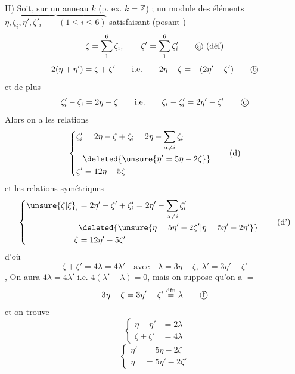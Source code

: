 II) Soit, sur un anneau $k$  (p. ex. $k=\mathbb Z$) ; un module   des éléments $\overbrace{\eta,\zeta_i,\eta',\zeta'_i\qquad(1\le i\le6)}$ satisfaisant (posant )
\[
\zeta=\sum_1^6\zeta_i,\qquad\zeta'=\sum_1^6\zeta'_i\tag*{\textcircled{a} (déf)}
\]
\[
2(\eta+\eta')=\zeta+\zeta'\qquad\text{i.e.}\qquad2\eta-\zeta=-(2\eta'-\zeta')\tag*{\textcircled{b}}
\]
et de plus
\[
\zeta'_i-\zeta_i=2\eta-\zeta\qquad\text{i.e.}\qquad\zeta_i-\zeta'_i=2\eta'-\zeta'\tag*{\textcircled{c}}
\]
Alors on a les relations
\[
\left\{\begin{aligned}
\zeta'_i&=2\eta-\zeta+\zeta_i=2\eta-\sum_{\alpha\ne i}\zeta_i\\
&\deleted{\unsure{\eta'=5\eta-2\zeta}}\\
\zeta'&=12\eta-5\zeta
\end{aligned}\right.\tag*{(d)}
\]
 
et les relations symétriques
\[
\left\{\begin{aligned}
\unsure{\zeta|\xi}_i&=2\eta'-\zeta'+\zeta'_i=2\eta'-\sum_{\alpha\ne i}\zeta'_i\\
&\deleted{\unsure{\eta=5\eta'-2\zeta'|\eta=5\eta'-2\eta'}}\\
\zeta&=12\eta'-5\zeta'
\end{aligned}\right.\tag*{(d')}
\]
d'où
\[
\zeta+\zeta'=4\lambda=4\lambda'\quad\text{avec}\quad
\lambda=3\eta-\zeta,\ \lambda'=3\eta'-\zeta'\tag*{(e)}
\]
, On aura  $4\lambda=4\lambda'$ i.e. $4(\lambda'-\lambda)=0$, mais on suppose qu'on a $=$
\[
3\eta-\zeta=3\eta'-\zeta'\overset{\mathrm{dfn}}=\lambda\tag*{\textcircled{f}}
\]
et on trouve 
\[
\left\{\begin{aligned}\eta+\eta'&=2\lambda\\\zeta+\zeta'&=4\lambda\end{aligned}\right.\tag*{(f)}
\]
\[
\left\{\begin{aligned}\eta'&=5\eta-2\zeta\\\eta&=5\eta'-2\zeta'\end{aligned}\right.\tag*{(g,g')}
\]

